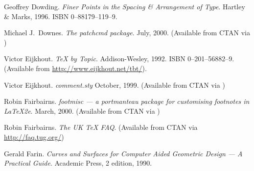 \begin{thebibliography}{GMS94A}
  Geoffrey Dowding.
  \newblock \emph{Finer Points in the Spacing \& Arrangement of Type}.
  \newblock Hartley \& Marks, 1996.
  \newblock ISBN 0--88179--119--9.

\begin{comment}
\bibitem[Dow98]{DOWDING98}
  Geoffrey Dowding.
  \newblock \emph{An Introduction to the History of Printing Types}.
  \newblock The British Library and Oak Knoll Press, 1998.
  \newblock ISBN 0--7123--4563--9 \textsc{uk},
                  1--884718--44--2 \textsc{usa}.
\end{comment}

  Michael J.~Downes.
  \newblock \emph{The patchcmd package}.
  \newblock July, 2000.
  \newblock (Available from CTAN via
             )

  Victor Eijkhout.
  \newblock \emph{TeX by Topic}.
  \newblock Addison-Wesley, 1992.
  \newblock ISBN 0--201--56882--9.
  \newblock (Available from \url{http://www.eijkhout.net/tbt/}).

  Victor Eijkhout.
  \newblock \emph{comment.sty}
  \newblock October, 1999.
  \newblock (Available from CTAN via
            )

\begin{comment}
\bibitem[Fai98]{MOREVERB}
  Robin Fairbairns.
  \newblock \emph{The moreverb package}.
  \newblock December, 1998.
  \newblock (Available from CTAN in
            \url{/macros/latex/contrib/moreverb})
\end{comment}

  Robin Fairbairns.
  \newblock \emph{footmisc --- a portmanteau package for customising
                  footnotes in LaTeX2e}.
  \newblock March, 2000.
  \newblock (Available from CTAN via
            )

  Robin Fairbairns.
  \newblock \emph{The UK TeX FAQ}.
  \newblock (Available from CTAN via
            \url{http://faq.tug.org/})

Gerald Farin.
\newblock \emph{Curves and Surfaces for Computer Aided Geometric
  Design --- A Practical Guide}.
\newblock Academic Press, 2 edition, 1990.


\end{thebibliography}
